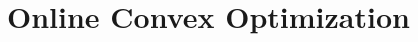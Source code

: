 \documentclass[main.tex]{subfiles}
\begin{document}
\chapter{Online Convex Optimization}
\end{document}
